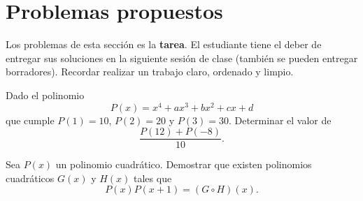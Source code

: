 \section{Problemas propuestos}

Los problemas de esta sección es la \textbf{tarea}.
El estudiante tiene el deber de entregar sus soluciones en la siguiente sesión de clase (también se pueden entregar borradores).
Recordar realizar un trabajo claro, ordenado y limpio.

\showLine
\begin{multicols}{2}
    \begin{problem}
        Dado el polinomio
        \[
            P(x) = x^4 + ax^3 + bx^2 + cx + d
        \]
        que cumple $P(1) = 10$, $P(2) = 20$ y $P(3) = 30$.
        Determinar el valor de
        \[
            \frac{P(12) + P(-8)}{10}.
        \]
    \end{problem}

    \begin{problem}
        Sea $P(x)$ un polinomio cuadrático.
        Demostrar que existen polinomios cuadráticos $G(x)$ y $H(x)$ tales que
        \[
            P(x)P(x+1) = (G \circ H)(x).
        \]
    \end{problem}
\end{multicols}